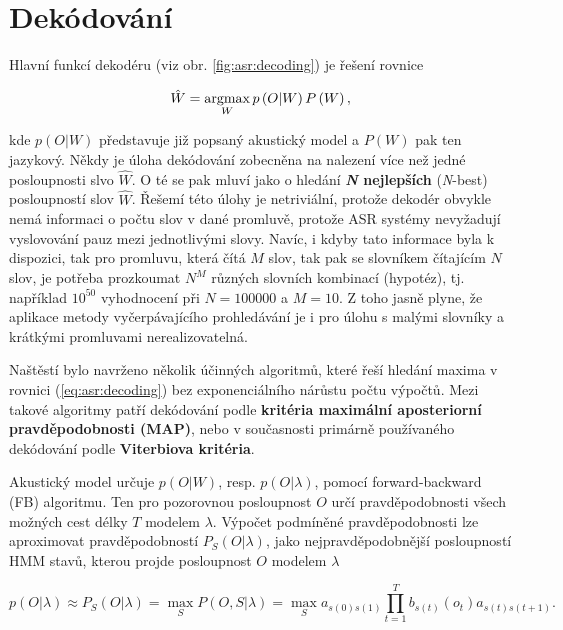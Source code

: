 \section{Dekódování}
\label{chap:asr:decoding}

Hlavní funkcí dekodéru (viz obr. \ref{fig:asr:decoding}) je řešení rovnice

\begin{equation}
  \hat{W} = \operatorname*{argmax}_{W} p\left(O | W\right)P\left(W\right),
  \label{eq:asr:decoding:decoder}
\end{equation}

\noindent kde $p\left(O|W\right)$ představuje již popsaný akustický model a $P\left(W\right)$ pak ten jazykový. Někdy je úloha dekódování zobecněna na nalezení více než jedné posloupnosti slvo $\hat{W}$. O té se pak mluví jako o hledání \textbf{\textit{N} nejlepších} (\textit{N}-best) posloupností slov $\hat{W}$.  Řešemí této úlohy je netriviální, protože dekodér obvykle nemá informaci o počtu slov v dané promluvě, protože ASR systémy nevyžadují vyslovování pauz mezi jednotlivými slovy. Navíc, i kdyby tato informace byla k dispozici, tak pro promluvu, která čítá $M$ slov, tak pak se slovníkem čítajícím $N$ slov, je potřeba prozkoumat $N^{M}$ různých slovních kombinací (hypotéz), tj. například $10^{50}$ vyhodnocení při $N=100000$ a $M=10$. Z toho jasně plyne, že aplikace metody vyčerpávajícího prohledávání je i pro úlohu s malými slovníky a krátkými promluvami nerealizovatelná.

Naštěstí bylo navrženo několik účinných algoritmů, které řeší hledání maxima v rovnici (\ref{eq:asr:decoding}) bez exponenciálního nárůstu počtu výpočtů. Mezi takové algoritmy patří dekódování podle \textbf{kritéria maximální aposteriorní pravděpodobnosti (MAP)}, nebo v současnosti primárně používaného dekódování podle \textbf{Viterbiova kritéria}.

Akustický model určuje $p\left(O|W\right)$, resp. $p\left(O|\lambda\right)$, pomocí forward-backward (FB) algoritmu. Ten pro pozorovnou posloupnost $O$ určí pravděpodobnosti všech možných cest délky $T$ modelem $\lambda$. Výpočet podmíněné pravděpodobnosti lze aproximovat pravděpodobností $P_S(O|\lambda)$, jako nejpravděpodobnější posloupností HMM stavů, kterou projde posloupnost $O$ modelem $\lambda$

\begin{equation}
  p\left(O|\lambda\right) \approx P_S\left(O|\lambda\right) = \max_S P\left(O, S| \lambda \right) = \max_S a_{s\left(0\right)s\left(1\right)} \prod_{t=1}^{T} b_{s\left(t\right)}\left(o_t\right) a_{s\left(t\right)s\left(t+1\right)}.
  \label{eq:asr:decoding:approx}
\end{equation}

